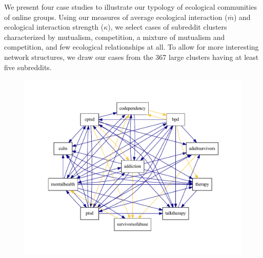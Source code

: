 \documentclass[letterpaper]{article}\usepackage[]{graphicx}\usepackage[]{color}
\def\Slash{\slash\hspace{0pt}}
\begin{document}
We present four case studies to illustrate our typology of ecological communities of online groups.  Using our measures of average ecological interaction ($\overline{m}$) and ecological interaction strength ($\kappa$), we select cases of subreddit clusters characterized by mutualism, competition, a mixture of mutualism and competition, and few ecological relationships at all. To allow for more interesting network structures, we draw our cases from the 367 large clusters having at least five subreddits. 

\begin{figure}
\begin{minipage}[t][][t]{1\columnwidth}
  \centering
  \hspace*{-0.1\columnwidth}\includegraphics[width=1.2\columnwidth]{figures/mental_graphviz.pdf}
\end{minipage} \hfill
\begin{minipage}[t][][t]{\columnwidth}
  \centering

\end{minipage}
\end{figure}
\end{document}
